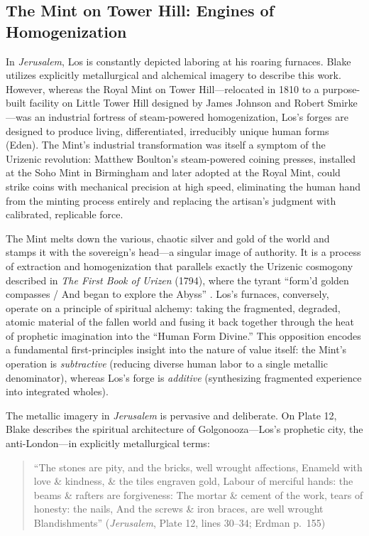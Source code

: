 \documentclass[
]{article}
\begin{document}
\subsection{The Mint on Tower Hill: Engines of
Homogenization}\label{the-mint-on-tower-hill-engines-of-homogenization}

In \emph{Jerusalem}, Los is constantly depicted laboring at his roaring
furnaces. Blake utilizes explicitly metallurgical and alchemical imagery
to describe this work. However, whereas the Royal Mint on Tower
Hill---relocated in 1810 to a purpose-built facility on Little Tower
Hill designed by James Johnson and Robert Smirke---was an industrial
fortress of steam-powered homogenization, Los's forges are designed to
produce living, differentiated, irreducibly unique human forms (Eden).
The Mint's industrial transformation was itself a symptom of the
Urizenic revolution: Matthew Boulton's steam-powered coining presses,
installed at the Soho Mint in Birmingham and later adopted at the Royal
Mint, could strike coins with mechanical precision at high speed,
eliminating the human hand from the minting process entirely and
replacing the artisan's judgment with calibrated, replicable force.

The Mint melts down the various, chaotic silver and gold of the world
and stamps it with the sovereign's head---a singular image of authority.
It is a process of extraction and homogenization that parallels exactly
the Urizenic cosmogony described in \emph{The First Book of Urizen}
(1794), where the tyrant ``form'd golden compasses / And began to
explore the Abyss'' \citep{blake1795urizen}. Los's furnaces, conversely,
operate on a principle of spiritual alchemy: taking the fragmented,
degraded, atomic material of the fallen world and fusing it back
together through the heat of prophetic imagination into the ``Human Form
Divine.'' This opposition encodes a fundamental first-principles insight
into the nature of value itself: the Mint's operation is
\emph{subtractive} (reducing diverse human labor to a single metallic
denominator), whereas Los's forge is \emph{additive} (synthesizing
fragmented experience into integrated wholes).

The metallic imagery in \emph{Jerusalem} is pervasive and deliberate. On
Plate 12, Blake describes the spiritual architecture of
Golgonooza---Los's prophetic city, the anti-London---in explicitly
metallurgical terms:

\begin{quote}
``The stones are pity, and the bricks, well wrought affections, Enameld
with love \& kindness, \& the tiles engraven gold, Labour of merciful
hands: the beams \& rafters are forgiveness: The mortar \& cement of the
work, tears of honesty: the nails, And the screws \& iron braces, are
well wrought Blandishments'' (\emph{Jerusalem}, Plate 12, lines 30--34;
Erdman p.~155) \citep{erdman1988complete}
\end{quote}
\end{document}
